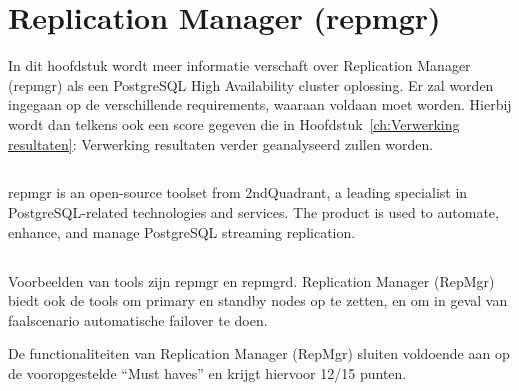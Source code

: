 
\chapter{Replication Manager (repmgr)}
\label{ch:Replication Manager (repmgr)}

In dit hoofdstuk wordt meer informatie verschaft over Replication Manager (repmgr) als een PostgreSQL High Availability cluster oplossing. Er zal worden ingegaan op de verschillende requirements, waaraan voldaan moet worden. Hierbij wordt dan telkens ook een score gegeven die in Hoofdstuk~\ref{ch:Verwerking resultaten}: Verwerking resultaten verder geanalyseerd zullen worden.

\section{}
\label{sec:Inleiding tot Replication Manager (repmgr)}

repmgr is an open-source toolset from 2ndQuadrant, a leading specialist in PostgreSQL-related technologies and services. The product is used to automate, enhance, and manage PostgreSQL streaming replication.

\section{}
\label{sec:Requirements}

\subsection{}
\label{subsec:Must have}


Voorbeelden van tools zijn repmgr en repmgrd.
Replication Manager (RepMgr) biedt ook de tools om primary en standby nodes op te zetten, en om in geval van faalscenario automatische failover te doen.

De functionaliteiten van Replication Manager (RepMgr) sluiten voldoende aan op de vooropgestelde “Must haves” en krijgt hiervoor 12/15 punten.

\subsubsection{}
\label{subsubsec:Replicatie}

